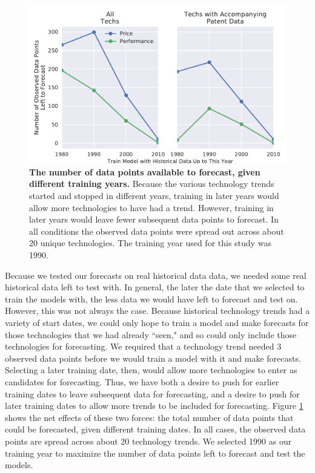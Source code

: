 \documentclass{article}
\begin{document}
\begin{figure}
    \centering
    \includegraphics[width=.75\textwidth]{figs/Observed_Technology_Data_to_Forecast.pdf}
    \caption{\textbf{The number of data points available to forecast, given different training years.} Because the various technology trends started and stopped in different years, training in later years would allow more technologies to have had a trend. However, training in later years would leave fewer subsequent data points to forecast. In all conditions the observed data points were spread out across about 20 unique technologies. The training year used for this study was 1990.}
    \label{fig:Observed_Technology_Data_to_Forecast}
\end{figure}

Because we tested our forecasts on real historical data data, we needed some real historical data left to test with. In general, the later the date that we selected to train the models with, the less data we would have left to forecast and test on. However, this was not always the case. Because historical technology trends had a variety of start dates, we could only hope to train a model and make forecasts for those technologies that we had already ``seen," and so could only include those technologies for forecasting. We required that a technology trend needed 3 observed data points before we would train a model with it and make forecasts. Selecting a later training date, then, would allow more technologies to enter as candidates for forecasting. Thus, we have both a desire to push for earlier training dates to leave subsequent data for forecasting, and a desire to push for later training dates to allow more trends to be included for forecasting. Figure \ref{fig:Observed_Technology_Data_to_Forecast} shows the net effects of these two forces: the total number of data points that could be forecasted, given different training dates. In all cases, the observed data points are spread across about 20 technology trends. We selected 1990 as our training year to maximize the number of data points left to forecast and test the models. 
\end{document}
